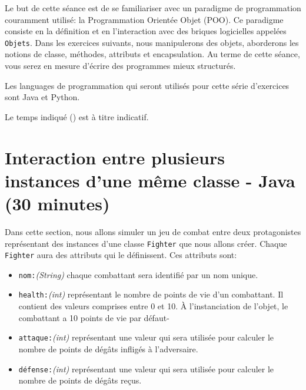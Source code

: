 




\ShowSolutiontrue
\ShowConseiltrue
\titre
{}

Le but de cette séance est de se familiariser avec un paradigme de programmation couramment utilisé: la Programmation Orientée Objet (POO). Ce paradigme consiste en la définition et en l'interaction avec des briques logicielles appelées \lstinline{Objets}. Dans les exercices suivants, nous manipulerons des objets, aborderons les notions de classe, méthodes, attributs et encapsulation. Au terme de cette séance, vous serez en mesure d'écrire des programmes mieux structurés.

Les languages de programmation qui seront utilisés pour cette série d'exercices sont Java et Python.

Le temps indiqué (\faClock) est à titre indicatif.

\section{Interaction entre plusieurs instances d'une même classe - Java (30 minutes)}

Dans cette section, nous allons simuler un jeu de combat entre deux protagonistes représentant des instances d'une classe \lstinline{Fighter} que nous allons créer.
Chaque \lstinline{Fighter} aura des attributs qui le définissent. Ces attributs sont:

\begin{itemize}
    \item \lstinline{nom:}\textit{(String)} chaque combattant sera identifié par un nom unique.
    \item \lstinline{health:}\textit{(int)} représentant le nombre de points de vie d'un combattant. Il contient des valeurs comprises entre 0 et 10. À l'instanciation de l'objet, le combattant a 10 points de vie par défaut-
    \item \lstinline{attaque:}\textit{(int)} représentant une valeur qui sera utilisée pour calculer le nombre de points de dégâts infligés à l'adversaire.
    \item \lstinline{défense:}\textit{(int)} représentant une valeur qui sera utilisée pour calculer le nombre de points de dégâts reçus.\\
\end{itemize}

